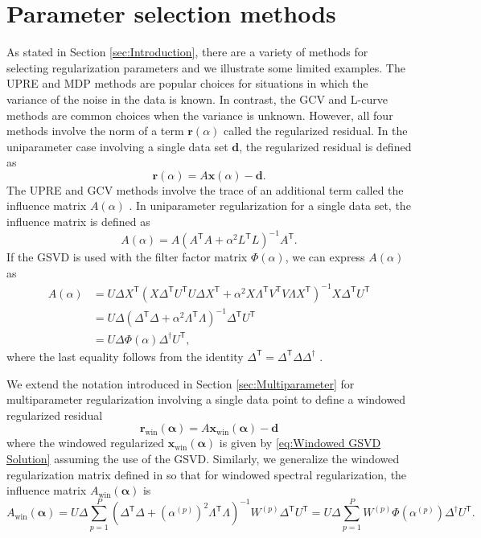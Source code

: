 \documentclass[12pt]{article}
\newcommand{\dVec}{\mathbf{d}}	%
\newcommand{\rVec}{\mathbf{r}}	%
\newcommand{\xVec}{\mathbf{x}}	%
\newcommand{\trans}[1]{{#1}^\mathsf{T}}	%
\newcommand{\inv}[1]{{#1}^{-1}}	%
\newcommand{\pinv}[1]{{#1}^\dagger}	%
\newcommand{\regparam}{\alpha}  %
\newcommand{\regparamVec}{\bm{\regparam}}   %
\newcommand{\xReg}{\xVec(\regparam)}	%
\newcommand{\xWin}{\xVec_{\text{win}}}	%
\newcommand{\AWin}{A_{\text{win}}}	%
\newcommand{\rReg}{\rVec(\regparam)}	%
\newcommand{\rWin}{\rVec_{\text{win}}}	%
\newcommand{\A}{A(\regparam)}	%
\begin{document}
\section{Parameter selection methods} \label{sec:Methods}
As stated in Section \ref{sec:Introduction}, there are a variety of methods for selecting regularization parameters and we illustrate some limited examples. The UPRE and MDP methods are popular choices for situations in which the variance of the noise in the data is known. In contrast, the GCV and L-curve methods are common choices when the variance is unknown. However, all four methods involve the norm of a term $\rReg$ called the regularized residual. In the uniparameter case involving a single data set $\dVec$, the regularized residual is defined as
\begin{equation}
\label{eq:Regularized Residual}
\rReg = A\xReg - \dVec.
\end{equation}
The UPRE and GCV methods involve the trace of an additional term called the influence matrix $\A$ \cite[p.~98]{Vogel:2002}. In uniparameter regularization for a single data set, the influence matrix is defined as
\begin{equation}
    \label{eq:Influence matrix}
    \A = A\inv{\left(\trans{A}A + \regparam^2\trans{L}L\right)}\trans{A}.
\end{equation}
If the GSVD is used with the filter factor matrix $\Phi(\regparam)$, we can express $\A$ as
\begin{align*}
    \A &= U\Delta\trans{X}\inv{\left(X\trans{\Delta}\trans{U}U\Delta\trans{X} + \regparam^2 X\trans{\Lambda}\trans{V}V\Lambda\trans{X}\right)}X\trans{\Delta}\trans{U} \\
    &= U\Delta\inv{\left(\trans{\Delta}\Delta + \regparam^2 \trans{\Lambda}\Lambda\right)}\trans{\Delta}\trans{U} \\
    &= U\Delta\Phi(\regparam)\pinv{\Delta}\trans{U},
\end{align*}
where the last equality follows from the identity $\trans{\Delta} = \trans{\Delta}\Delta\pinv{\Delta}$ \cite{Byrne}. \par
We extend the notation introduced in Section \ref{sec:Multiparameter} for multiparameter regularization involving a single data point to define a windowed regularized residual
\begin{equation}
\label{eq:Windowed regularized residual}
\rWin(\regparamVec) = A\xWin(\regparamVec) - \dVec
\end{equation}
where the windowed regularized $\xWin(\regparamVec)$ is given by \eqref{eq:Windowed GSVD Solution} assuming the use of the GSVD. Similarly, we generalize the windowed regularization matrix defined in \cite{ChungEasleyOLeary} so that for windowed spectral regularization, the influence matrix $\AWin(\regparamVec)$ is
\[\AWin(\regparamVec) = U\Delta\sum_{p=1}^{P}\inv{\left(\trans{\Delta}\Delta + \left(\regparam^{(p)}\right)^2 \trans{\Lambda}\Lambda\right)}W^{(p)}\trans{\Delta}\trans{U} = U\Delta\sum_{p=1}^{P}W^{(p)}\Phi\left(\regparam^{(p)}\right)\pinv{\Delta}\trans{U}.\]
\end{document}
